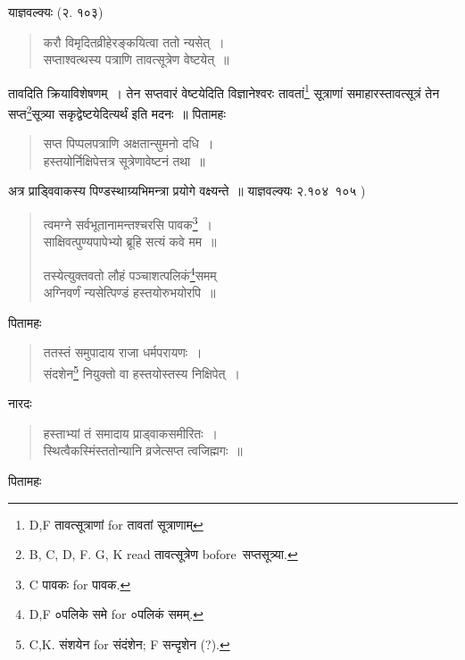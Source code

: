 \documentclass[11pt, openany]{book}
\begin{document}
याज्ञवल्क्यः (२. १०३) 

\begin{quote}
{\vy करौ विमृदितव्रीहेरङ्कयित्वा ततो न्यसेत्~।\\
सप्ताश्वत्थस्य पत्राणि तावत्सूत्रेण वेष्टयेत्~॥}
\end{quote}

तावदिति क्रियाविशेषणम्~। तेन सप्तवारं वेष्टयेदिति विज्ञानेश्वरः तावतां\renewcommand{\thefootnote}{2}\footnote{D,F तावत्सूत्राणां for तावतां सूत्राणाम्\textendash } सूत्राणां समाहारस्तावत्सूत्रं तेन सप्त\renewcommand{\thefootnote}{3}\footnote{B, C, D, F. G, K read तावत्सूत्रेण bofore\textendash\ सप्तसूत्र्या.}सूत्र्या सकृद्वेष्टयेदित्यर्थं इति मदनः~॥ पितामहः

\begin{quote}
{\vy सप्त पिप्पलपत्राणि अक्षतान्सुमनो दधि~।\\
हस्तयोर्निक्षिपेत्तत्र सूत्रेणावेष्टनं तथा~॥}
\end{quote}

अत्र प्राड्विवाकस्य पिण्डस्थाग्र्यभिमन्त्रा प्रयोगे वक्ष्यन्ते~॥ याज्ञवल्क्यः २.१०४\textendash\ १०५ ) 

\begin{quote}
{\vy त्वमग्ने सर्वभूतानामन्तश्चरसि पावक\renewcommand{\thefootnote}{4}\footnote{C पावकः for पावक.}~।\\
साक्षिवत्पुण्यपापेभ्यो ब्रूहि सत्यं कवे मम~॥

तस्येत्युक्तवतो लौहं पञ्चाशत्पलिकं\renewcommand{\thefootnote}{5}\footnote{D,F ०पलिके समे for ०पलिकं समम्.}समम्\\
अग्निवर्णं न्यसेत्पिण्डं हस्तयोरुभयोरपि~॥}
\end{quote}

पितामहः 

\begin{quote}
{\vy ततस्तं समुपादाय राजा धर्मपरायणः~।\\
संदशेन\renewcommand{\thefootnote}{6}\footnote{C,K. संशयेन for संदंशेन; F सन्दृशेन (?).} नियुक्तो वा हस्तयोस्तस्य निक्षिपेत्~।}
\end{quote}

\newpage

नारदः 

\begin{quote}
{\vy हस्ताभ्यां तं समादाय प्राड्वाकसमीरितः~।\\
स्थित्वैकस्मिंस्ततोन्यानि व्रजेत्सप्त त्वजिह्मगः~॥}
\end{quote}

पितामहः 
\end{document}
